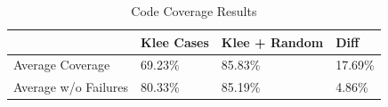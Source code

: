 \begin{table}[]
\caption{Code Coverage Results}
\label{tab:kleeresults}
\begin{tabular}{@{}llll@{}}
\toprule
                     & Klee Cases & Klee + Random & Diff    \\ \midrule
Average Coverage     & 69.23\%    & 85.83\%       & 17.69\% \\
Average w/o Failures & 80.33\%    & 85.19\%       & 4.86\%  \\ \bottomrule
\end{tabular}
\end{table}
\textbf{}